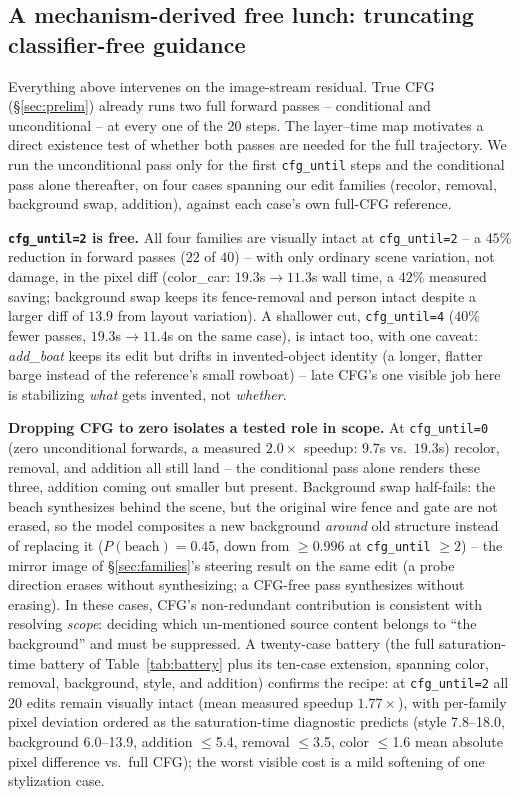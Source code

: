 \documentclass[10pt,twocolumn,letterpaper]{article}
\begin{document}
\subsection{A mechanism-derived free lunch: truncating classifier-free
guidance}\label{sec:cfgfreelunch}

Everything above intervenes on the image-stream residual. True CFG
(\S\ref{sec:prelim}) already runs two full forward passes -- conditional
and unconditional -- at every one of the 20 steps. The layer--time map
motivates a direct existence test of whether both passes are needed for
the full trajectory. We run the unconditional pass
only for the first \texttt{cfg\_until} steps and the conditional pass
alone thereafter, on four cases spanning our edit families (recolor,
removal, background swap, addition), against each case's own full-CFG
reference.

\textbf{\texttt{cfg\_until=2} is free.} All four families are visually
intact at \texttt{cfg\_until=2} -- a $45\%$ reduction in forward passes
($22$ of $40$) -- with only ordinary scene variation, not damage, in the
pixel diff (color\_car: $19.3$s$\to$$11.3$s wall time, a $42\%$ measured
saving; background swap keeps its fence-removal and person intact
despite a larger diff of $13.9$ from layout variation). A shallower cut,
\texttt{cfg\_until=4} ($40\%$ fewer passes, $19.3$s$\to$$11.4$s on the
same case), is intact too, with one caveat: \emph{add\_boat} keeps its
edit but drifts in invented-object identity (a longer, flatter barge
instead of the reference's small rowboat) -- late CFG's one visible job
here is stabilizing \emph{what} gets invented, not \emph{whether}.

\textbf{Dropping CFG to zero isolates a tested role in scope.} At \texttt{cfg\_until=0} (zero unconditional forwards, a
measured $2.0\times$ speedup: $9.7$s vs.\ $19.3$s) recolor, removal, and
addition all still land -- the conditional pass alone renders these
three, addition coming out smaller but present. Background
swap half-fails: the beach synthesizes behind the scene, but the
original wire fence and gate are not erased, so the model composites a
new background \emph{around} old structure instead of replacing it
($P(\text{beach})=0.45$, down from $\ge0.996$ at \texttt{cfg\_until}
$\ge2$) -- the mirror image of \S\ref{sec:families}'s steering result on
the same edit (a probe direction erases without synthesizing; a
CFG-free pass synthesizes without erasing). In these cases, CFG's
non-redundant contribution is consistent with resolving \emph{scope}:
deciding which
un-mentioned source content belongs to ``the background'' and must be
suppressed. A twenty-case battery (the full saturation-time battery of
Table~\ref{tab:battery} plus its ten-case extension, spanning color,
removal, background, style, and addition) confirms the recipe: at \texttt{cfg\_until=2}
all 20 edits remain visually intact (mean measured speedup
$1.77\times$), with per-family pixel deviation ordered as the
saturation-time diagnostic predicts (style 7.8--18.0, background 6.0--13.9,
addition $\le$5.4, removal $\le$3.5, color $\le$1.6 mean absolute
pixel difference vs.\ full CFG); the worst visible cost is a mild
softening of one stylization case.
\end{document}
